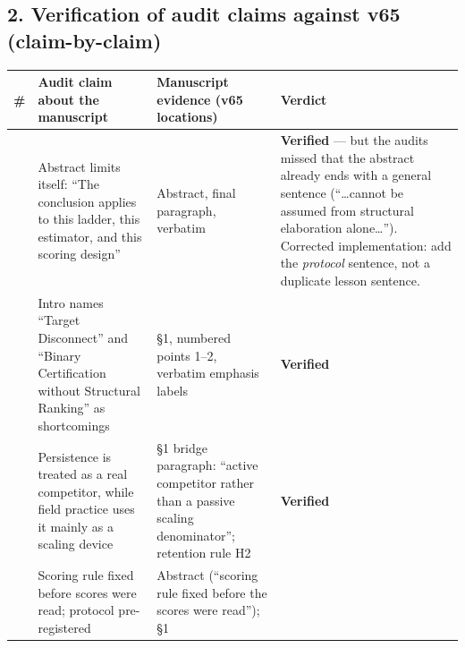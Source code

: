 \documentclass[11pt]{article}
\begin{document}
\subsection{2. Verification of audit claims against v65
(claim-by-claim)}\label{verification-of-audit-claims-against-v65-claim-by-claim}

{\def\LTcaptype{none} %
\begin{longtable}[]{@{}
  >{\raggedright\arraybackslash}p{}
  >{\raggedright\arraybackslash}p{}
  >{\raggedright\arraybackslash}p{}
  >{\raggedright\arraybackslash}p{}@{}}
\toprule\noalign{}
\begin{minipage}[b]{\linewidth}\raggedright
\#
\end{minipage} & \begin{minipage}[b]{\linewidth}\raggedright
Audit claim about the manuscript
\end{minipage} & \begin{minipage}[b]{\linewidth}\raggedright
Manuscript evidence (v65 locations)
\end{minipage} & \begin{minipage}[b]{\linewidth}\raggedright
Verdict
\end{minipage} \\
\midrule\noalign{}
\endhead
\bottomrule\noalign{}
\endlastfoot
1 & Abstract limits itself: ``The conclusion applies to this ladder,
this estimator, and this scoring design'' & Abstract, final paragraph,
verbatim & \textbf{Verified} --- but the audits missed that the abstract
already ends with a general sentence (``\ldots cannot be assumed from
structural elaboration alone\ldots{}''). Corrected implementation: add
the \emph{protocol} sentence, not a duplicate lesson sentence. \\
2 & Intro names ``Target Disconnect'' and ``Binary Certification without
Structural Ranking'' as shortcomings & §1, numbered points 1--2,
verbatim emphasis labels & \textbf{Verified} \\
3 & Persistence is treated as a real competitor, while field practice
uses it mainly as a scaling device & §1 bridge paragraph: ``active
competitor rather than a passive scaling denominator''; retention rule
H2 & \textbf{Verified} \\
4 & Scoring rule fixed before scores were read; protocol pre-registered
& Abstract (``scoring rule fixed before the scores were read''); §1

\end{longtable}}
\end{document}
